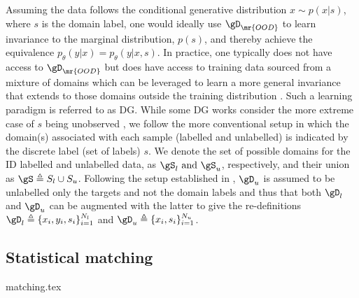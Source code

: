 Assuming the data follows the conditional generative distribution \( x \sim p(x | s) \), where
\(s\) is the domain label, one would ideally use \( \gD_{\mr{OOD}} \) to learn invariance to the
marginal distribution, \( p(s) \), and thereby achieve the equivalence \( p_\theta(y | x) =
p_\theta(y | x,
s) \).
%
In practice, one typically does not have access to \( \gD_{\mr{OOD}} \) but does have access to
training data sourced from a mixture of domains which can be leveraged to learn a more general
invariance that extends to those domains outside the training distribution
\citep{arjovsky2019invariant}.
%
Such a learning paradigm is referred to as \acf{DG}.
%
While some \ac{DG} works consider the more extreme case of $s$ being unobserved
\citep{creager2021environment}, we follow the more conventional setup \citep{arjovsky2019invariant,
krueger2021out, SagWeiLeeGaoetal22} in which the domain(s) associated with each sample (labelled
and unlabelled) is indicated by the discrete label (set of labels) $s$. 
%
We denote the set of possible domains for the \ac{ID} labelled and unlabelled data, as \( \gS_l$
and $\gS_u \), respectively, and their union as \( \gS \triangleq S_l \cup S_u \).
%
Following the setup established in \citet{SagWeiLeeGaoetal22}, \( \gD_u \) is assumed to be
unlabelled only \wrt{} the targets and not \wrt{} the domain labels and thus that both \( \gD_l \)
and \( \gD_u \) can be augmented with the latter to give the re-definitions \( \gD_l \triangleq \{
x_i, y_i, s_i \}_{i=1}^{N_l} \) and \( \gD_u \triangleq \{x_i, s_i \}_{i=1}^{N_u} \).

\subsection{Statistical matching} 
{matching.tex}
